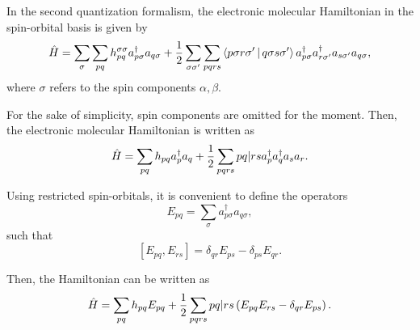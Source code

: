 In the second quantization formalism, the electronic molecular Hamiltonian in 
the spin-orbital basis is given by
\begin{equation}
    \hat{H} =
    \sum_{\sigma} 
    \sum_{pq} h_{pq}^{\sigma \sigma} a_{p \sigma}^{\dagger} a_{q \sigma}
    +
    \frac{1}{2} \sum_{\sigma \sigma^{\prime}} \sum_{pqrs} 
    \Braket{p\sigma r \sigma^{\prime} | q\sigma s \sigma^{\prime}}
    a_{p \sigma}^{\dagger} a_{r \sigma^{\prime}}^{\dagger} a_{s \sigma^{\prime}} a_{q \sigma}
    ,
\end{equation}
where $\sigma$ refers to the spin components $\alpha, \beta$.

For the sake of simplicity, spin components are omitted for the moment.
Then, the electronic molecular Hamiltonian is written as
\begin{equation}
    \hat{H} =
    \sum_{pq} h_{pq} a_p^{\dagger} a_q
    +
    \frac{1}{2} \sum_{pqrs} \PBraket{pq | rs} a_p^{\dagger} a_q^{\dagger} a_s a_r
    .
\end{equation}

Using restricted spin-orbitals, it is convenient to define the operators 
\begin{equation}
    E_{pq} =
    \sum_{\sigma} a_{p\sigma}^{\dagger} a_{q\sigma}
    ,
\end{equation}
such that 
\begin{equation}
    \left[ E_{pq}, E_{rs} \right] =
    \delta_{qr} E_{ps} - \delta_{ps} E_{qr}
    .
\end{equation}

Then, the Hamiltonian can be written as 
\begin{equation}
    \hat{H} =
    \sum_{pq} h_{pq} E_{pq}
    + \frac{1}{2}
    \sum_{pqrs} \PBraket{pq | rs}\left( E_{pq} E_{rs} - \delta_{qr}E_{ps} \right)
    .
\end{equation}

